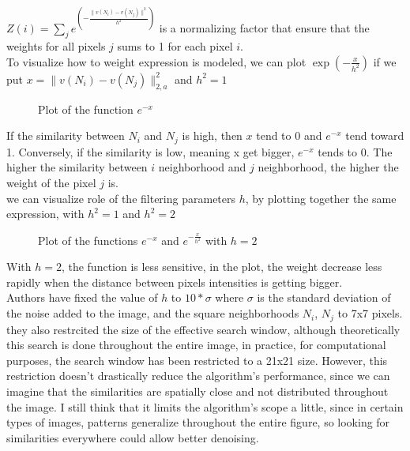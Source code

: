 \documentclass[a4paper, twocolumn, twoside]{article}
\begin{document}
$Z(i) = \sum_j e^{\left(-\frac{\|v(N_i) - v(N_j)\|^2}{h^2}\right)}$ is a normalizing factor that ensure that the weights for all pixels $j$ sums to 1
for each pixel $i$.\\
To visualize how to weight expression is modeled,
we can plot $\exp({-\frac{x}{h^2}})$ if we put $x=\|v(N_i) - v(N_j)\|_{2,a}^2$ and $h^2 = 1$
\begin{figure}[H]
\centering
{}
\caption{Plot of the function $e^{-x}$}
\end{figure}
If the similarity between $N_i$ and $N_j$ is high, then $x$ tend to $0$
and $e^{-x}$ tend toward 1. Conversely, if the similarity is low, meaning x get bigger, $e^{-x}$ tends to 0.
The higher the similarity between $i$ neighborhood and $j$ neighborhood, the higher the weight of the pixel $j$ is.\\
we can visualize role of the filtering parameters $h$, by plotting together the same expression, with $h^2 = 1$ and $h^2 = 2$
\begin{figure}[H]
\centering
{}
\caption{Plot of the functions $e^{-x}$ and $e^{-\frac{x}{h^2}}$ with $h=2$}
\end{figure}
With $h=2$, the function is less sensitive, in the plot, the weight decrease less rapidly when the distance between pixels intensities is getting bigger.\\
Authors have fixed the value of $h$ to $10*\sigma$ where $\sigma$ is the standard deviation of the noise added to the image, and the square neighborhoods $N_i$, $N_j$ to 7x7 pixels.
they also restrcited the size of the effective search window,
although theoretically this search is done throughout the entire image,
in practice, for computational purposes, the search window has been restricted
to a 21x21 size.
However, this restriction doesn't drastically 
reduce the algorithm's performance,
since we can imagine that the similarities are spatially
close and not distributed throughout the image.
I still think that it limits the algorithm's scope a little,
since in certain types of images, patterns generalize throughout the entire figure,
so looking for similarities everywhere could allow better 
denoising.\\
\end{document}
